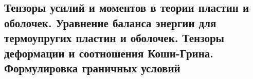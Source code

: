 

\subsection{Тензоры усилий и моментов в теории пластин и оболочек. Уравнение баланса энергии для термоупругих пластин и оболочек. Тензоры деформации и соотношения Коши-Грина. Формулировка граничных условий}



